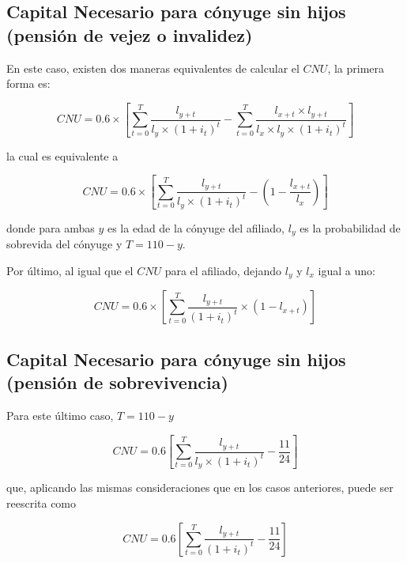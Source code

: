 \documentclass[letterpaper, 11pt]{article}
\begin{document}
\subsection{Capital Necesario para c\'onyuge sin hijos (pensi\'on de vejez o invalidez)}

En este caso, existen dos maneras equivalentes de calcular el $CNU$, la primera forma es:

\begin{equation*}
CNU = 0.6\times \left[\sum_{t=0}^T{\frac{l_{y + t}}{l_y\times (1 + i_t)^t}}-\sum_{t=0}^T{\frac{l_{x+t}\times l_{y+t}}{l_x \times l_y \times (1 + i_t)^t}}\right]
\end{equation*}

\noindent la cual es equivalente a

\begin{equation*}
CNU = 0.6\times \left[\sum_{t=0}^T{\frac{l_{y + t}}{l_y\times (1 + i_t)^t}}-\left( 1 - \frac{l_{x+t}}{l_x}\right)\right]
\end{equation*}

\noindent donde para ambas $y$ es la edad de la c\'onyuge del afiliado, $l_y$ es la probabilidad
de sobrevida del c\'onyuge y $T = 110 - y$.

Por \'ultimo, al igual que el $CNU$ para el afiliado, dejando $l_y$ y $l_x$ igual a
uno:

\begin{equation}\label{eq:cnu_2_2}
CNU = 0.6\times \left[\sum_{t=0}^T{\frac{l_{y + t}}{(1 + i_t)^t}}\times\left( 1 - l_{x+t}\right)\right]
\end{equation}

\subsection{Capital Necesario para c\'onyuge sin hijos (pensi\'on de sobrevivencia)}

Para este \'ultimo caso, $T=110-y$

\begin{equation*}
CNU = 0.6\left[\sum_{t=0}^{T}{\frac{l_{y+t}}{l_y \times (1 + i_t)^t} - \frac{11}{24}}\right]
\end{equation*}

\noindent que, aplicando las mismas consideraciones que en los casos anteriores,
puede ser reescrita como

\begin{equation}\label{eq:cnu_1_1}
CNU = 0.6\left[\sum_{t=0}^{T}{\frac{l_{y+t}}{(1 + i_t)^t} - \frac{11}{24}}\right]
\end{equation}
\end{document}
